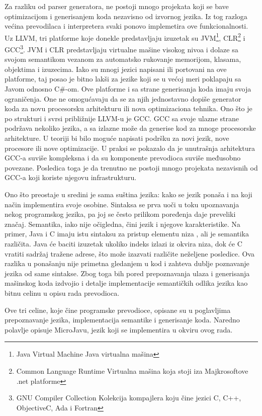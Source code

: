 Za razliku od parser generatora, ne postoji mnogo projekata koji se bave optimizacijom i generisanjem koda nezavisno od izvornog jezika.
Iz tog razloga većina prevodilaca i interpretera svaki ponovo implemetira ove funkcionalnosti. 
Uz LLVM, tri platforme koje donekle predstavljaju izuzetak su 
JVM\footnote{\skr \eng Java Virtual Machine \ndash Java virtualna mašina}, 
CLR\footnote{\skr \eng Common Language Runtime \ndash Virtualna mašina koja stoji iza Majkrosoftove .net platforme} 
i GCC\footnote{\skr \eng GNU Compiler Collection \ndash Kolekcija kompajlera koju čine jezici C, C++, ObjectiveC, Ada i Fortran}. 
JVM i CLR predstavljaju virtualne mašine visokog nivoa i dolaze sa svojom semantikom vezanom za automatsko rukovanje memorijom, klasama, objektima i izuzecima. 
Iako su mnogi jezici napisani ili portovani na ove platforme, taj posao je bitno lakši za jezike koji se u većoj meri poklapaju sa Javom odnosno C\#-om. 
Ove platforme i sa strane generisanja koda imaju svoja ograničenja.
One ne omogućavaju da se za njih jednostavno dopiše generator koda za novu procesorsku arhitekturu ili nova optimizaciona tehnika. 
Ono što je po strukturi i svrsi približnije LLVM-u je GCC.
GCC sa svoje ulazne strane podržava nekoliko jezika, a sa izlazne može da generise kod za mnoge procesorske arhitekture.
U teoriji bi bilo moguće napisati podršku za novi jezik, nove procesore ili nove optimizacije.
U praksi se pokazalo da je unutrašnja arhitektura GCC-a suviše kompleksna i da su komponente prevodioca suviše međusobno povezane. 
Posledica toga je da trenutno ne postoji mnogo projekata nezavisnih od GCC-a koji koriste njegovu infrastrukturu.

Ono što preostaje u sredini je sama suština jezika: kako se jezik ponaša i na koji način implementira svoje osobine.
Sintaksa se prva uoči u toku upoznavanja nekog programskog jezika, pa joj se često prilikom poređenja daje preveliki značaj.
Semantika, iako nije očigledna, čini jezik i njegove karakteristike.
Na primer, Java i C imaju istu sintaksu za pristup elementu niza \ndash {}, ali je semantika različita.
Java će baciti izuzetak ukoliko indeks izlazi iz okvira niza, dok će C vratiti sadržaj tražene adrese, što može izazvati različite neželjene posledice.
Ova razlika u ponašanju nije primetna gledanjem u kod i zahteva dublje poznavanje jezika od same sintakse.
Zbog toga bih pored prepoznavanja ulaza i generisanja mašinskog koda izdvojio i detalje implementacije semantičkih odlika jezika kao bitnu celinu u opisu rada prevodioca.

Ove tri celine, koje čine programske prevodioce, opisane su u poglavljima prepoznavanje jezika, implementacija semantike i generisanje koda.
Naredno polavlje opisuje MicroJavu, jezik koji se implementira u okviru ovog rada.
